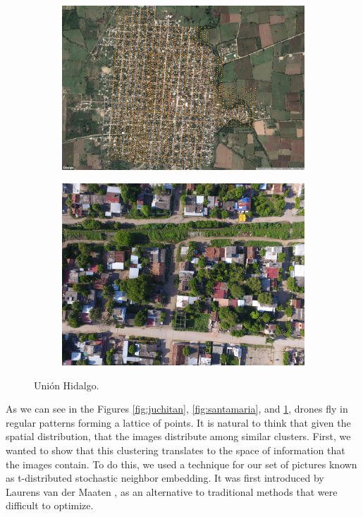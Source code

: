 \begin{figure}[!ht]
  \centering
    \begin{subfigure}{.8\textwidth}
        \includegraphics[width=\textwidth]{images/union-satellite.jpg}
    \end{subfigure}
    \begin{subfigure}{.8\textwidth}
        \includegraphics[width=\textwidth]{images/union-sample.jpg}
    \end{subfigure}
  \caption{Uni\'on Hidalgo.}
  \label{fig:union}
\end{figure}

As we can see in the Figures \ref{fig:juchitan}, \ref{fig:santamaria}, and \ref{fig:union}, drones fly in regular patterns forming a lattice of points. It is natural to think that given the spatial distribution, that the images distribute among similar clusters. First, we wanted to show that this clustering translates to the space of information that the images contain. To do this, we used a technique for our set of pictures known as t-distributed stochastic neighbor embedding. It was first introduced by Laurens van der Maaten \cite{t-sne}, as an alternative to traditional methods that were difficult to optimize.\\

